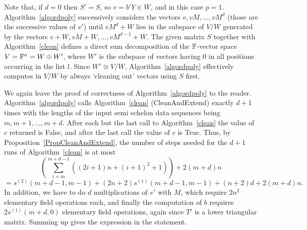 \begin{Rem}
Note that, if $d=0$ then $S'=S$, so $v=b'Y\in W$, and in this case $p=1$. 
Algorithm~\ref{algordpoly} successively considers the vectors $v,
vM, \ldots, vM^d$  (those are the successive values of
$v'$) until $vM^d+W$ lies in the subspace of $V/W$ 
generated by the vectors $v+W, vM+W, \ldots, vM^{d-1}+W$. 
The given matrix $S$ together with Algorithm~\ref{clean} defines a
direct sum decomposition of the $\mathbb{F}$-vector space $V = \mathbb{F}^n = W \oplus
W'$,
where $W'$ is the subspace of vectors having $0$ in all positions
occurring in the list $l$. Since $W' \cong V/W$, 
Algorithm~\ref{algordpoly} effectively computes in $V/W$ by always `cleaning
out' vectors using $S$ first. 
\end{Rem}

We again leave the proof of correctness of Algorithm~\ref{algordpoly}
to the reader.
Algorithm~\ref{algordpoly} calls Algorithm~\ref{clean} ({\sc CleanAnd\-Extend}) exactly
$d+1$ times with the lengths of the input semi echelon data
sequences being $m,m+1, \ldots, m+d$. After each but the last call to
Algorithm~\ref{clean} the value of 
$c$ returned is {\sc False}, and after the last call the value of $c$ 
is {\sc True}. Thus, by
Proposition~\ref{PropCleanAndExtend}, the number of steps needed 
for the $d+1$ runs of Algorithm~\ref{clean} is at most
\[
\left(\sum_{i=m}^{m+d-1} ((2i+1)n+(i+1)^2+1)\right)  +  2(m+d)n  \]
\[
   = s^{(2)}(m+d-1,m-1) + (2n+2)s^{(1)}(m+d-1,m-1) + (n+2)d +2(m+d)n.
\]
In addition, we have to do $d$ multiplications of $v'$ with $M$, which require
$2n^2$ elementary field operations each, and finally the computation of $b$
requires $2s^{(1)}(m+d,0)$ elementary field operations, again since 
$T'$ is a lower triangular matrix. Summing up gives the expression in 
the statement. 
\proofend

